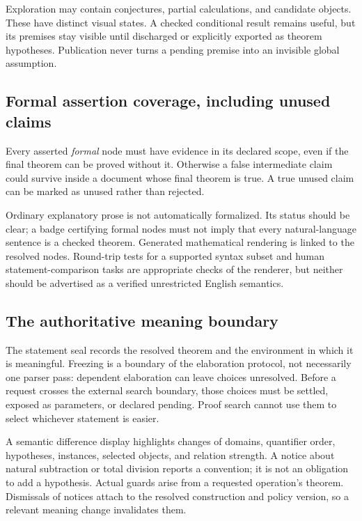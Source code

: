 \documentclass[11pt,letterpaper]{article}
\numberwithin{equation}{section}
\begin{document}
Exploration may contain conjectures, partial calculations, and candidate objects.
These have distinct visual states. A checked conditional result remains useful,
but its premises stay visible until discharged or explicitly exported as theorem
hypotheses. Publication never turns a pending premise into an invisible global
assumption.

\subsection{Formal assertion coverage, including unused claims}
Every asserted \emph{formal} node must have evidence in its declared scope, even
if the final theorem can be proved without it. Otherwise a false intermediate
claim could survive inside a document whose final theorem is true. A true unused
claim can be marked as unused rather than rejected.

Ordinary explanatory prose is not automatically formalized. Its status should be
clear; a badge certifying formal nodes must not imply that every natural-language
sentence is a checked theorem. Generated mathematical rendering is linked to the
resolved nodes. Round-trip tests for a supported syntax subset and human
statement-comparison tasks are appropriate checks of the renderer, but neither
should be advertised as a verified unrestricted English semantics.

\subsection{The authoritative meaning boundary}
The statement seal records the resolved theorem and the environment in which it
is meaningful. Freezing is a boundary of the elaboration protocol, not necessarily
one parser pass: dependent elaboration can leave choices unresolved. Before a
request crosses the external search boundary, those choices must be settled,
exposed as parameters, or declared pending. Proof search cannot use them to
select whichever statement is easier.

A semantic difference display highlights changes of domains, quantifier
order, hypotheses, instances, selected objects, and relation strength. A notice
about natural subtraction or total division reports a convention; it is not an
obligation to add a hypothesis. Actual guards arise from a requested operation's
theorem. Dismissals of notices attach to the resolved construction and policy
version, so a relevant meaning change invalidates them.
\end{document}
